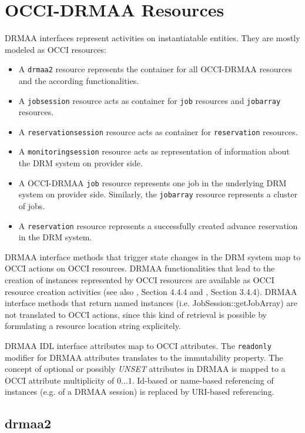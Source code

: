 \documentclass[10pt]{article}
\newcommand{\h}[1]{\lstinline|#1|}
\begin{document}
\section{OCCI-DRMAA Resources}

DRMAA interfaces represent activities on instantiatable entities. They are mostly modeled as OCCI resources:

\begin{itemize}
\item A \h{drmaa2} resource represents the container for all OCCI-DRMAA resources and the according functionalities. 
\item A \h{jobsession} resource acts as container for \h{job} resources and \h{jobarray} resources. 
\item A \h{reservationsession} resource acts as container for \h{reservation} resources. 
\item A \h{monitoringsession} resource acts as representation of information about the DRM system on provider side. 
\item A OCCI-DRMAA \h{job} resource represents one job in the underlying DRM system on provider side. Similarly, the \h{jobarray} resource represents a cluster of jobs.
\item A \h{reservation} resource represents a successfully created advance reservation in the DRM system.
\end{itemize}


DRMAA interface methods that trigger state changes in the DRM system map to OCCI actions on OCCI resources. DRMAA functionalities that lead to the creation of instances represented by OCCI resources are available as OCCI resource creation activities (see also \cite{gfd183}, Section 4.4.4 and \cite{gfd185}, Section 3.4.4). DRMAA interface methods that return named instances (i.e. JobSession::getJobArray) are not translated to OCCI actions, since this kind of retrieval is possible by formulating a resource location string explicitely. 

DRMAA IDL interface attributes map to OCCI attributes. The \h{readonly} modifier for DRMAA attributes translates to the immutability property. The concept of optional or possibly \emph{UNSET} attributes in DRMAA is mapped to a OCCI attribute multiplicity of $0\ldots1$. Id-based or name-based referencing of instances (e.g. of a DRMAA session) is replaced by URI-based referencing.

\subsection{drmaa2}
\end{document}
